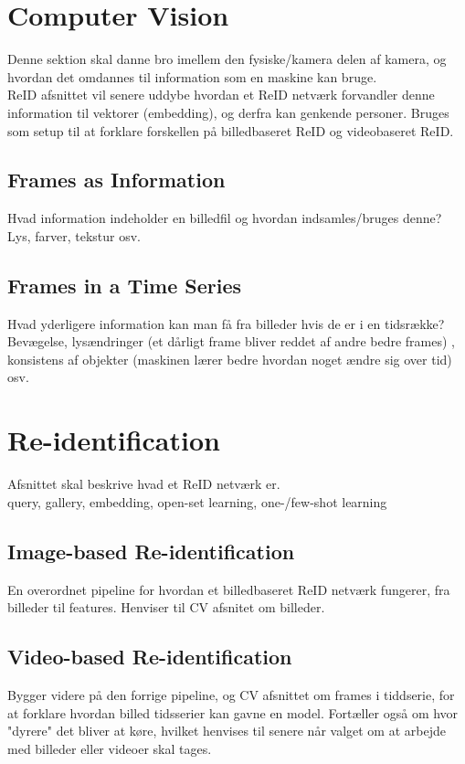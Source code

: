 \section{Computer Vision}
Denne sektion skal danne bro imellem den fysiske/kamera delen af kamera, og hvordan det omdannes til information som en maskine kan bruge. 
\\ ReID afsnittet vil senere uddybe hvordan et ReID netværk forvandler denne information til vektorer (embedding), og derfra kan genkende personer. Bruges som setup til at forklare forskellen på billedbaseret ReID og videobaseret ReID. 

\subsection{Frames as Information}
Hvad information indeholder en billedfil og hvordan indsamles/bruges denne?
\\ Lys, farver, tekstur osv. 

\subsection{Frames in a Time Series}
Hvad yderligere information kan man få fra billeder hvis de er i en tidsrække? 
\\ Bevægelse, lysændringer (et dårligt frame bliver reddet af andre bedre frames) , konsistens af objekter (maskinen lærer bedre hvordan noget ændre sig over tid) osv.


\section{Re-identification}
Afsnittet skal beskrive hvad et ReID netværk er. 
\\ query, gallery, embedding, open-set learning, one-/few-shot learning

\subsection{Image-based Re-identification}
En overordnet pipeline for hvordan et billedbaseret ReID netværk fungerer, fra billeder til features. Henviser til CV afsnitet om billeder.

\subsection{Video-based Re-identification}
Bygger videre på den forrige pipeline, og CV afsnittet om frames i tiddserie, for at forklare hvordan billed tidsserier kan gavne en model. Fortæller også om hvor "dyrere" det bliver at køre, hvilket henvises til senere når valget om at arbejde med billeder eller videoer skal tages. 

